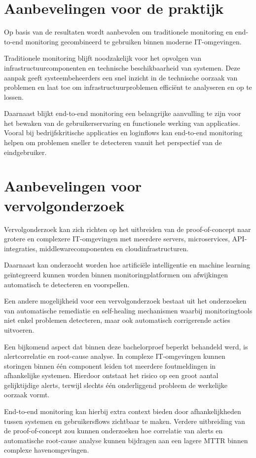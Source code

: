 \section{Aanbevelingen voor de praktijk}

Op basis van de resultaten wordt aanbevolen om traditionele monitoring en end-to-end monitoring gecombineerd te gebruiken binnen moderne IT-omgevingen.

Traditionele monitoring blijft noodzakelijk voor het opvolgen van infrastructuurcomponenten en technische beschikbaarheid van systemen. Deze aanpak geeft systeembeheerders een snel inzicht in de technische oorzaak van problemen en laat toe om infrastructuurproblemen efficiënt te analyseren en op te lossen.

Daarnaast blijkt end-to-end monitoring een belangrijke aanvulling te zijn voor het bewaken van de gebruikerservaring en functionele werking van applicaties. Vooral bij bedrijfskritische applicaties en loginflows kan end-to-end monitoring helpen om problemen sneller te detecteren vanuit het perspectief van de eindgebruiker.

\section{Aanbevelingen voor vervolgonderzoek}

Vervolgonderzoek kan zich richten op het uitbreiden van de proof-of-concept naar grotere en complexere IT-omgevingen met meerdere servers, microservices, API-integraties, middlewarecomponenten en cloudinfrastructuren.

Daarnaast kan onderzocht worden hoe artificiële intelligentie en machine learning geïntegreerd kunnen worden binnen monitoringplatformen om afwijkingen automatisch te detecteren en voorspellen.

Een andere mogelijkheid voor een vervolgonderzoek bestaat uit het onderzoeken van automatische remediatie en self-healing mechanismen waarbij monitoringtools niet enkel problemen detecteren, maar ook automatisch corrigerende acties uitvoeren.

Een bijkomend aspect dat binnen deze bachelorproef beperkt behandeld werd, is alertcorrelatie en root-cause analyse. In complexe IT-omgevingen kunnen storingen binnen één component leiden tot meerdere foutmeldingen in afhankelijke systemen. Hierdoor ontstaat het risico op een groot aantal gelijktijdige alerts, terwijl slechts één onderliggend probleem de werkelijke oorzaak vormt.

End-to-end monitoring kan hierbij extra context bieden door afhankelijkheden tussen systemen en gebruikersflows zichtbaar te maken. Verdere uitbreiding van de proof-of-concept zou kunnen onderzoeken hoe correlatie van alerts en automatische root-cause analyse kunnen bijdragen aan een lagere MTTR binnen complexe havenomgevingen.

